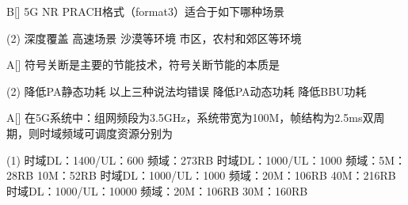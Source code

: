 

\begin{choice}{B}[]
    5G NR PRACH格式（format3）适合于如下哪种场景
    \begin{tasks}(2)
        \task 深度覆盖
        \task 高速场景
        \task 沙漠等环境
        \task 市区，农村和郊区等环境
    \end{tasks}
\end{choice}

\begin{choice}{A}[]
    符号关断是主要的节能技术，符号关断节能的本质是
    \begin{tasks}(2)
        \task 降低PA静态功耗
        \task 以上三种说法均错误
        \task 降低PA动态功耗
        \task 降低BBU功耗
    \end{tasks}
\end{choice}




\begin{choice}{A}[]
    在5G系统中：组网频段为3.5GHz，系统带宽为100M，帧结构为2.5ms双周期，则时域频域可调度资源分别为
    \begin{tasks}(1)
        \task 时域DL：1400/UL：600 频域：273RB
        \task 时域DL：1000/UL：1000 频域：5M：28RB 10M：52RB
        \task 时域DL：1000/UL：1000 频域：20M：106RB 40M：216RB
        \task 时域DL：1000/UL：10000 频域：20M：106RB 30M：160RB
    \end{tasks}
\end{choice}


